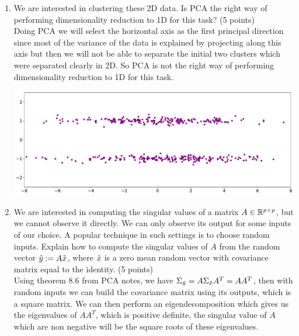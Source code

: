 \documentclass[11pt,twoside]{article}
\begin{document}
\begin{exam}


\item
\begin{exercise}
\begin{problem}

\begin{enumerate}
\item We are interested in clustering these 2D data. Is PCA the right way of performing dimensionality reduction to 1D for this task? (5 points)\\

\medskip
Doing PCA we will select the horizontal axis as the first principal direction since most of the variance of the data is explained by projecting along this axis but then we will not be able to separate the initial two clusters which were 
separated clearly in 2D. So PCA is not the  right way of performing dimensionality reduction to 1D for this task.

\begin{center}
\includegraphics[width=.75\linewidth]{figs/clustering_PCA.pdf}
\end{center}
\item We are interested in computing the singular values of a matrix $A \in \mathbb{R}^{p \times p}$, but we cannot observe it directly. We can only observe its output for some inputs of our choice. A popular technique in such settings is to choose random inputs. Explain how to compute the singular values of $A$ from the random vector $\tilde{ y }:=A \tilde{ x }$, where $\tilde{  x }$ is a zero mean random vector with covariance matrix equal to the identity.  (5 points)\\

Using theorem 8.6 from PCA notes, we  have $\Sigma_{\tilde{  y }} = A \Sigma_{\tilde{  x }} A^T = A A^T$, then with random inputs we can build the covariance matrix using its outputs, which is a square matrix.
We can then perform an eigendecomposition which gives us the eigenvalues of $AA^T$, which is positive definite, the singular value of $A$ which are non negative will be the square roots of these eigenvalues.



\end{enumerate}
\end{problem}
\end{exercise}
\end{exam}
\end{document}
